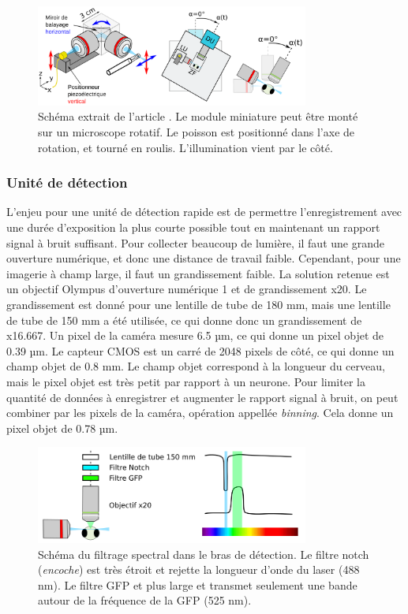 \begin{figure}
    \centering
    \includegraphics[width=0.8\textwidth]{./files/miniature_light-sheet.svg.png}
    \caption{Schéma extrait de l'article \cite{migault_whole-brain_2018}. Le module miniature peut être monté sur un microscope rotatif. Le poisson est positionné dans l'axe de rotation, et tourné en roulis. L'illumination vient par le côté.
    \label{FIGminiaturelightsheet}}
    \end{figure}

\subsubsection{Unité de détection}

L'enjeu pour une unité de détection rapide est de permettre l'enregistrement avec une durée d'exposition la plus courte possible tout en maintenant un rapport signal à bruit suffisant. Pour collecter beaucoup de lumière, il faut une grande ouverture numérique, et donc une distance de travail faible. Cependant, pour une imagerie à champ large, il faut un grandissement faible. La solution retenue est un objectif Olympus d'ouverture numérique 1 et de grandissement x20. Le grandissement est donné pour une lentille de tube de 180 mm, mais une lentille de tube de 150 mm a été utilisée, ce qui donne donc un grandissement de x16.667. Un pixel de la caméra mesure 6.5 µm, ce qui donne un pixel objet de 0.39 µm. Le capteur CMOS est un carré de 2048 pixels de côté, ce qui donne un champ objet de 0.8 mm. Le champ objet correspond à la longueur du cerveau, mais le pixel objet est très petit par rapport à un neurone. Pour limiter la quantité de données à enregistrer et augmenter le rapport signal à bruit, on peut combiner par les pixels de la caméra, opération appellée \emph{binning}. Cela donne un pixel objet de 0.78 µm.

\begin{figure}
\centering
\includegraphics[width=0.8\textwidth]{./files/detection_unit.svg.png}
\caption{Schéma du filtrage spectral dans le bras de détection. Le filtre notch (\emph{encoche}) est très étroit et rejette la longueur d'onde du laser (488 nm). Le filtre GFP et plus large et transmet seulement une bande autour de la fréquence de la GFP (525 nm).}
\end{figure}

